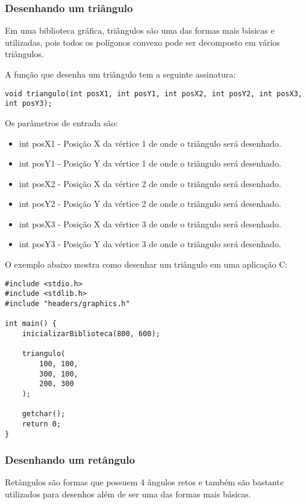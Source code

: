 \documentclass[12pt, %
openright,
oneside, %
a4paper,    %
brazil]{facom-ufu-abntex2}
\begin{document}
\subsubsection{Desenhando um triângulo}
Em uma biblioteca gráfica, triângulos são uma das formas mais básicas e utilizadas, pois todos os polígonos convexo pode ser decomposto em vários triângulos.

A função que desenha um triângulo tem a seguinte assinatura:

\begin{lstlisting}
void triangulo(int posX1, int posY1, int posX2, int posY2, int posX3, int posY3);
\end{lstlisting}

Os parâmetros de entrada são:

\begin{itemize}
    \item int posX1 - Posição X da vértice 1 de onde o triângulo será desenhado.
    \item int posY1 - Posição Y da vértice 1 de onde o triângulo será desenhado.

    \item int posX2 - Posição X da vértice 2 de onde o triângulo será desenhado.
    \item int posY2 - Posição Y da vértice 2 de onde o triângulo será desenhado.

    \item int posX3 - Posição X da vértice 3 de onde o triângulo será desenhado.
    \item int posY3 - Posição Y da vértice 3 de onde o triângulo será desenhado.
\end{itemize}

O exemplo abaixo mostra como desenhar um triângulo em uma aplicação C:

\begin{lstlisting}
#include <stdio.h>
#include <stdlib.h>
#include "headers/graphics.h"

int main() {
    inicializarBiblioteca(800, 600);

    triangulo(
        100, 100,
        300, 100,
        200, 300
    );

    getchar();
    return 0;
}
\end{lstlisting}

\subsubsection{Desenhando um retângulo}
Retângulos são formas que possuem 4 ângulos retos e também são bastante utilizados para desenhos além de ser uma das formas mais básicas.
\end{document}

